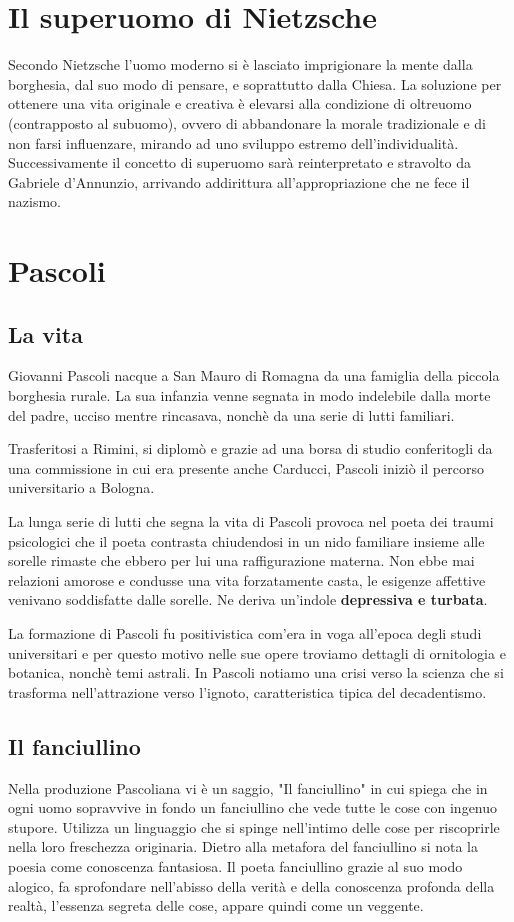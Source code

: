 \documentclass[10pt]{report}
\begin{document}
		\section{Il superuomo di Nietzsche}
		Secondo Nietzsche l’uomo moderno si è lasciato imprigionare la mente dalla borghesia, dal suo modo di pensare, e soprattutto dalla Chiesa.
		 La soluzione per ottenere una vita originale e creativa è elevarsi alla condizione di oltreuomo (contrapposto al subuomo), ovvero di abbandonare la morale tradizionale e di non farsi influenzare, mirando ad uno sviluppo estremo dell’individualità. 
		 Successivamente il concetto di superuomo sarà reinterpretato e stravolto da\\ Gabriele d’Annunzio, arrivando addirittura all’appropriazione che ne fece il nazismo.
		\section{Pascoli}
		
		\subsection{La vita}
	
		Giovanni Pascoli nacque a San Mauro di Romagna da una famiglia della piccola borghesia rurale. La sua infanzia venne segnata in modo indelebile dalla morte del padre, ucciso mentre rincasava, nonchè da una serie di lutti familiari.
		
		Trasferitosi a Rimini, si diplomò e grazie ad una borsa di studio conferitogli da una commissione in cui era presente anche Carducci, Pascoli iniziò il percorso universitario a Bologna.
		
		La lunga serie di lutti che segna la vita di Pascoli provoca nel poeta dei traumi psicologici che il poeta contrasta chiudendosi in un nido familiare insieme alle sorelle rimaste che ebbero per lui una raffigurazione materna.
		Non ebbe mai relazioni amorose e condusse una vita forzatamente casta, le esigenze affettive venivano soddisfatte dalle sorelle.
		Ne deriva un'indole \textbf{ depressiva e turbata}.
		
		La formazione di Pascoli fu positivistica com'era in voga all'epoca degli studi universitari e per questo motivo nelle sue opere troviamo dettagli di ornitologia e botanica, nonchè temi astrali.
		In Pascoli notiamo una crisi verso la scienza che si trasforma nell'attrazione verso l'ignoto, caratteristica tipica del decadentismo.
		
		\subsection[Fanciullino]{Il fanciullino}
		Nella produzione Pascoliana vi è un saggio, "Il fanciullino" in cui spiega che in ogni uomo sopravvive in fondo un fanciullino che vede tutte le cose con ingenuo stupore.
		Utilizza un linguaggio che si spinge nell'intimo delle cose per riscoprirle nella loro freschezza originaria.
		Dietro alla metafora del fanciullino si nota la poesia come conoscenza fantasiosa.
		Il poeta fanciullino grazie al suo modo alogico, fa sprofondare nell'abisso della verità e della conoscenza profonda della realtà, l'essenza segreta delle cose, appare quindi come un veggente.
		
\end{document}
